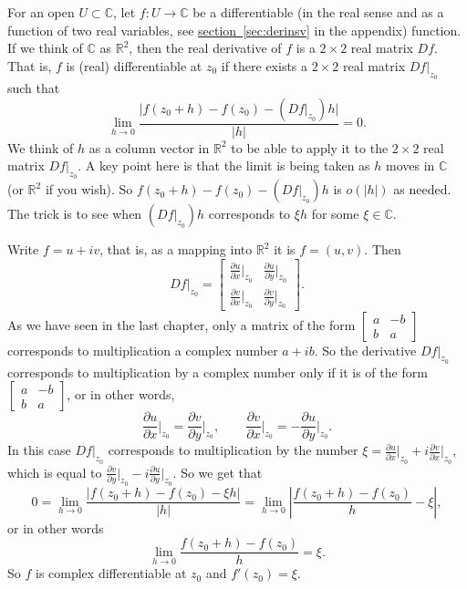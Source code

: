 \documentclass[12pt,openany]{book}
\newcommand{\sabs}[1]{\lvert {#1} \rvert}
\newcommand{\abs}[1]{\left\lvert {#1} \right\rvert}
\newcommand{\C}{{\mathbb{C}}}
\newcommand{\R}{{\mathbb{R}}}
\theoremstyle{plain}
\theoremstyle{remark}
\theoremstyle{definition}
\theoremstyle{exercise}
\theoremstyle{example}
\newcommand{\sectionref}[1]{\hyperref[#1]{section~\ref*{#1}}}
\begin{document}
For an open $U \subset \C$,
let $f \colon U \to \C$ be a
differentiable (in the real sense
and as a function of two real variables,
see \sectionref{sec:derinsv} in the appendix) function.
If we think of $\C$ as $\R^2$,
then the real derivative of $f$ is a $2 \times 2$ real matrix $D f$.
That is, $f$ is (real) differentiable at $z_0$ if there exists
a $2 \times 2$ real matrix $Df|_{z_0}$ such that
\begin{equation*}
\lim_{h \to 0} \frac{\sabs{f(z_0+h) - f(z_0) - (Df|_{z_0}) h}}{\sabs{h}} = 0 .
\end{equation*}
We think of $h$ as a column vector in $\R^2$ 
to be able to apply it to the
$2 \times 2$ real matrix $Df|_{z_0}$.
A key point here is that the limit is being taken
as $h$ moves in $\C$ (or $\R^2$ if you wish).
So $f(z_0+h) - f(z_0) - (Df|_{z_0}) h$ is $o(\sabs{h})$ as needed.
The trick is to see when $(Df|_{z_0}) h$ corresponds to $\xi h$
for some $\xi \in \C$.

Write $f = u+iv$, that is, as a
mapping into $\R^2$ it is $f = (u,v)$.  Then
\begin{equation*}
Df|_{z_0} =
\begin{bmatrix}
\frac{\partial u}{\partial x}\big|_{z_0} & \frac{\partial u}{\partial
y}\big|_{z_0} \\[5pt]
\frac{\partial v}{\partial x}\big|_{z_0} & \frac{\partial v}{\partial y}\big|_{z_0}
\end{bmatrix} .
\end{equation*}
As we have seen in the last chapter, only a matrix of the form
$\left[ \begin{smallmatrix}
a & -b \\ b & a
\end{smallmatrix} \right]$ corresponds to multiplication a complex number $a+ib$.
So the derivative $Df|_{z_0}$ corresponds to multiplication by a
complex number only if it is of the form
$\left[ \begin{smallmatrix}
a & -b \\ b & a
\end{smallmatrix} \right]$, or in other words,
\begin{equation*}
\frac{\partial u}{\partial x}\Big|_{z_0} =
\frac{\partial v}{\partial y}\Big|_{z_0}
, \qquad
\frac{\partial v}{\partial x}\Big|_{z_0} =
-\frac{\partial u}{\partial y}\Big|_{z_0} .
\end{equation*}
In this case $Df|_{z_0}$ corresponds to multiplication by the number
$\xi = \frac{\partial u}{\partial x}\big|_{z_0} + i \frac{\partial v}{\partial
x}\big|_{z_0}$, which is equal to
$\frac{\partial v}{\partial y}\big|_{z_0} - i \frac{\partial u}{\partial
y}\big|_{z_0}$.
So we get that
\begin{equation*}
0 = \lim_{h \to 0} \frac{\sabs{f(z_0+h) - f(z_0) - \xi h}}{\sabs{h}} =
\lim_{h \to 0} \abs{\frac{f(z_0+h) - f(z_0)}{h} - \xi} ,
\end{equation*}
or in other words
\begin{equation*}
\lim_{h \to 0} \frac{f(z_0+h) - f(z_0)}{h} = \xi .
\end{equation*}
So $f$ is complex differentiable at $z_0$ and $f'(z_0) = \xi$.
\end{document}
